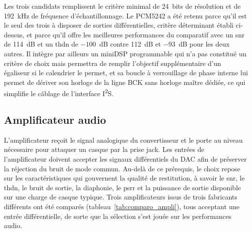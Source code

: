 Les trois candidats remplissent le critère minimal de 24~bits de résolution et de 192~kHz de fréquence d'échantillonnage. Le PCM5242 a été retenu parce qu'il est le seul des trois à disposer de sorties différentielles, critère déterminant établi ci-dessus, et parce qu'il offre les meilleures performances du comparatif avec un \gls{snr} de 114~dB et un \gls{thdn} de $-100$~dB contre 112~dB et $-93$~dB pour les deux autres. Il intègre par ailleurs un miniDSP programmable qui n'a pas constitué un critère de choix mais permettra de remplir l'objectif supplémentaire d'un égaliseur si le calendrier le permet, et sa boucle à verrouillage de phase interne lui permet de dériver son horloge de la ligne BCK sans horloge maître dédiée, ce qui simplifie le câblage de l'interface I\textsuperscript{2}S.






\subsection{Amplificateur audio}

L'amplificateur reçoit le signal analogique du convertisseur et le porte au niveau nécessaire pour attaquer un casque par la prise jack. Les entrées de l'amplificateur doivent accepter les signaux différentiels du DAC afin de préserver la réjection du bruit de mode commun. Au-delà de ce prérequis, le choix repose sur les caractéristiques qui gouvernent la qualité de restitution, à savoir le \gls{snr}, le \gls{thdn}, le bruit de sortie, la diaphonie, le \gls{psrr} et la puissance de sortie disponible sur une charge de casque typique. Trois amplificateurs issus de trois fabricants différents ont été comparés (tableau~\ref{tab:comparo_ampli}), tous acceptant une entrée différentielle, de sorte que la sélection s'est jouée sur les performances audio.

